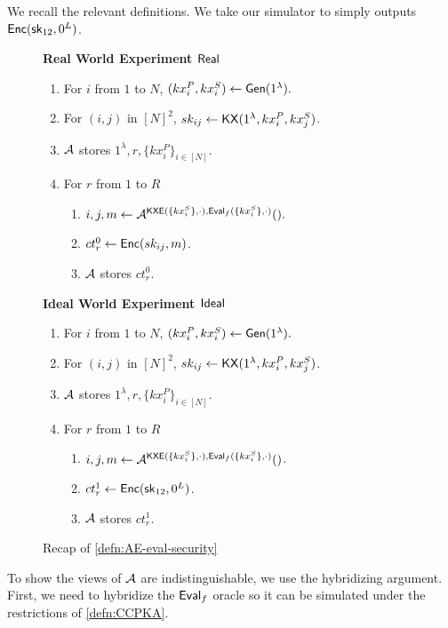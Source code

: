 We recall the relevant definitions. We take our simulator to simply outputs $\mathsf{Enc}({\mathsf{sk}}_{12}, 0^{L})$.
\begin{figure}[h!]
\begin{framed}
\textbf{Real World Experiment $\mathsf{Real}$}
\begin{enumerate}
    \item For $i$ from $1$ to $N$, $(kx_i^P, kx_i^S) \leftarrow \mathsf{Gen}(1^{\lambda}).$
    \item For $(i, j)$ in $[N]^2$, $sk_{ij} \leftarrow \mathsf{KX}(1^{\lambda}, kx_i^P, kx_j^S)$.
    \item $\mathcal{A}$ stores $1^{\lambda}, r, \{kx_i^P\}_{i \in [N]}$.
    \item For $r$ from $1$ to $R$
    \begin{enumerate}
        \item $i, j, m \leftarrow \mathcal{A}^{\mathsf{KXE}(\{kx_i^S\}, \cdot), \mathsf{Eval}_f(\{kx_i^S\}, \cdot)}().$
        \item $ct^{0}_r \leftarrow \mathsf{Enc}(sk_{ij}, m)$.
        \item $\mathcal{A}$ stores $ct^{0}_r$.
    \end{enumerate}
\end{enumerate}
\textbf{Ideal World Experiment $\mathsf{Ideal}$}
\begin{enumerate}
    \item For $i$ from $1$ to $N$, $(kx_i^P, kx_i^S) \leftarrow \mathsf{Gen}(1^{\lambda}).$
    \item For $(i, j)$ in $[N]^2$, $sk_{ij} \leftarrow \mathsf{KX}(1^{\lambda}, kx_i^P, kx_j^S)$.
    \item $\mathcal{A}$ stores $1^{\lambda}, r, \{kx_i^P\}_{i \in [N]}$.
    \item For $r$ from $1$ to $R$
    \begin{enumerate}
        \item $i, j, m \leftarrow \mathcal{A}^{\mathsf{KXE}(\{kx_i^S\}, \cdot), \mathsf{Eval}_f(\{kx_i^S\}, \cdot)}()$.
        \item $ct^1_r \leftarrow \mathsf{Enc}({\mathsf{sk}}_{12}, 0^{L})$.
        \item $\mathcal{A}$ stores $ct^{1}_r$.
    \end{enumerate}
\end{enumerate}
\end{framed}
\caption{Recap of \cref{defn:AE-eval-security}}
\end{figure}
To show the views of $\mathcal{A}$ are indistinguishable, we use the hybridizing argument. First, we need to hybridize the $\mathsf{Eval}_f$ oracle so it can be simulated under the restrictions of \cref{defn:CCPKA}. 
